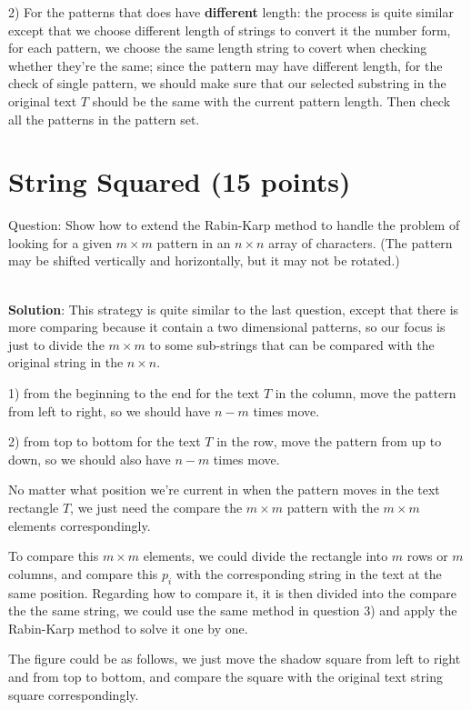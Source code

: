 \documentclass{article}
\begin{document}
2) For the patterns that does have \textbf{different} length: the process is quite similar except that we choose different length of strings to convert it the number form, for each pattern, we choose the same length string to covert when checking whether they're the same; since the pattern may have different length, for the check of single pattern, we should make sure that our selected substring in the original text $T$ should be the same with the current pattern length. Then check all the patterns in the pattern set.


\section{String Squared (15 points)}
Question: Show how to extend the Rabin-Karp method to handle the problem of looking for a given $m \times m$ pattern in an $n \times n$ array of characters. (The pattern may be shifted vertically and horizontally, but it may not be rotated.)

~\\
\textbf{Solution}:\newline
\indent This strategy is quite similar to the last question, except that there is more comparing because it contain a two dimensional patterns, so our focus is just to divide the $m \times m$ to some sub-strings that can be compared with the original string in the $n \times n$.

1) from the beginning to the end for the text $T$ in the column, move the pattern from left to right, so we should have $n-m$ times move.

2) from top to bottom for the text $T$ in the row, move the pattern from up to down, so we should also have $n-m$ times move.

No matter what position we're current in when the pattern moves in the text rectangle $T$, we just need the compare the $m \times m$ pattern with the $m \times m$ elements correspondingly.

To compare this $m \times m$ elements, we could divide the rectangle into $m$ rows or $m$ columns, and compare this $p_{i}$ with the corresponding string in the text at the same position. Regarding how to compare it, it is then divided into the compare the the same string, we could use the same method in question 3) and apply the Rabin-Karp method to solve it one by one.

The figure could be as follows, we just move the shadow square from left to right and from top to bottom, and compare the square with the original text string square correspondingly.
\end{document}
